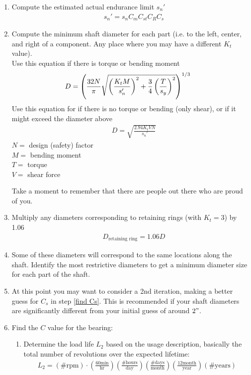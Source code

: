 \documentclass[11pt, fleqn]{article}
\begin{document}
\begin{enumerate}
    \item Compute the estimated actual endurance limit $s_n'$
    \begin{align*}
        &s_n'=s_nC_mC_{st}C_RC_s
    \end{align*}
    \item Compute the minimum shaft diameter for each part (i.e. to the left, center, and right of a component. Any place where you may have a different $K_t$ value).\\
    Use this equation if there is torque or bending moment
    \begin{align*}
        &D=\left( \frac{32N}{\pi}\sqrt{\left( \frac{K_tM}{s_n'} \right)^2+\frac{3}{4}\left( \frac{T}{s_y} \right)^2} \right)^{1/3}
    \end{align*}
    Use this equation for if there is no torque or bending (only shear), or if it might exceed the diameter above
    \begin{align*}
        &D=\sqrt{\frac{2.94K_tVN}{s_n'}}
    \end{align*}
    $N=$ design (safety) factor\\
    $M=$ bending moment\\
    $T=$ torque\\
    $V=$ shear force

    Take a moment to remember that there are people out there who are proud of you.
    \item Multiply any diameters corresponding to retaining rings (with $K_t=3$) by 1.06
    \begin{align*}
        &D_\text{retaining ring}=1.06D
    \end{align*}
    \item Some of these diameters will correspond to the same locations along the shaft. Identify the most restrictive diameters to get a minimum diameter size for each part of the shaft.
    \item At this point you may want to consider a 2nd iteration, making a better guess for $C_s$ in step \ref{find Cs}. This is recommended if your shaft diameters are significantly different from your initial guess of around $2"$.

    \item Find the $C$ value for the bearing:
        \begin{enumerate}
            \item Determine the load life $L_2$ based on the usage description, basically the total number of revolutions over the expected lifetime:
                \begin{align*}
                    L_2 = (\text{\# rpm})\cdot(\frac{60\text{min}}{\text{hr}})(\frac{\text{\# hours}}{\text{day}})(\frac{\text{\# days}}{\text{month}})(\frac{12 \text{month}}{\text{year}})(\text{\# years})
                \end{align*}


\end{enumerate}
\end{enumerate}
\end{document}
